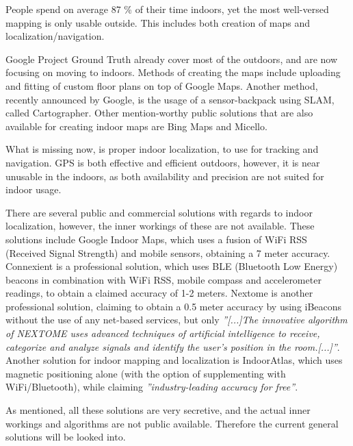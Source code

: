 
People spend on average 87 \% of their time indoors\cite{time_spend_indoor}, yet the most well-versed mapping is only usable outside.
This includes both creation of maps and localization/navigation.

Google Project Ground Truth\cite{googleio_ground_truth} already cover most of the outdoors, and are now focusing on moving to indoors\cite{googleio_indoor_maps}\cite{indoor_maps_google_slides}.
Methods of creating the maps include uploading and fitting of custom floor plans on top of Google Maps.
Another method, recently announced by Google, is the usage of a sensor-backpack using SLAM, called Cartographer\cite{cartographer}.
Other mention-worthy public solutions that are also available for creating indoor maps are Bing Maps\cite{bingmaps} and Micello\cite{micello}.

What is missing now, is proper indoor localization, to use for tracking and navigation.
GPS\cite{gps} is both effective and efficient outdoors, however, it is near unusable in the indoors, as both availability and precision are not suited for indoor usage.

There are several public and commercial solutions with regards to indoor localization, however, the inner workings of these are not available.
These solutions include Google Indoor Maps, which uses a fusion of WiFi RSS (Received Signal Strength) and mobile sensors, obtaining a 7 meter accuracy\cite{googleio_indoor_maps}.
Connexient is a professional solution, which uses BLE (Bluetooth Low Energy) beacons in combination with WiFi RSS, mobile compass and accelerometer readings, to obtain a claimed accuracy of 1-2 meters\cite{connexient_indoor_pos}.
Nextome is another professional solution, claiming to obtain a 0.5 meter accuracy by using iBeacons\cite{ibeacon} without the use of any net-based services, but only \textit{''[...]The innovative algorithm of NEXTOME uses advanced techniques of artificial intelligence to receive, categorize and analyze signals and identify the user’s position in the room.[...]''}\cite{nextome_indoor_pos}.
Another solution for indoor  mapping and localization is IndoorAtlas, which uses magnetic positioning alone (with the option of supplementing with WiFi/Bluetooth), while claiming \textit{''industry-leading accuracy for free''}\cite{indooratlas_features}.

As mentioned, all these solutions are very secretive, and the actual inner workings and algorithms are not public available.
Therefore the current general solutions will be looked into.